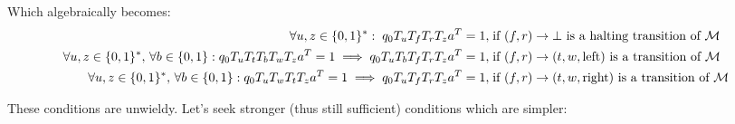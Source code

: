 Which algebraically becomes:
{\small
\begin{align*}
  \forall u,z\in\{0, 1\}^*: \; q_0 T_u T_f T_r T_z a^T = 1, \;                                                                           & \text{if $(f,r) \to \bot$ is a halting transition of $\mathcal{M}$}
  \\
  \forall u,z\in\{0, 1\}^*,\,\forall b \in \{0, 1\}: q_0 T_{u} T_t T_b T_w T_{z} a^T = 1 \implies q_0 T_{u} T_b T_f T_r T_{z} a^T = 1,\; & \text{if $(f,r) \to (t,w,\text{left})$ is a transition of $\mathcal{M}$}
  \\
  \forall u,z\in\{0, 1\}^*,\,\forall b \in \{0, 1\}: q_0 T_{u} T_w T_t T_{z} a^T = 1 \implies q_0 T_{u} T_f T_r T_{z} a^T = 1,\;         & \text{if $(f,r) \to (t,w,\text{right})$ is a transition of $\mathcal{M}$}
\end{align*}
}

These conditions are unwieldy. Let's seek stronger (thus still sufficient) conditions which are simpler:

